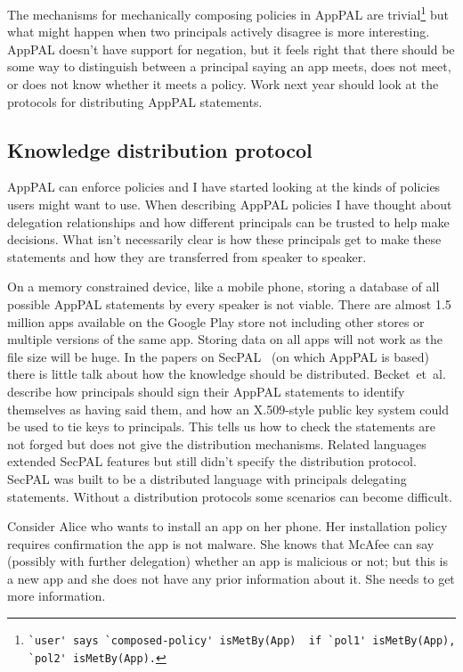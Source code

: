 \documentclass[a4paper]{scrartcl}
\begin{document}
The mechanisms for mechanically composing policies in AppPAL are trivial\footnote{\lstinline{`user' says `composed-policy' isMetBy(App)  if `pol1' isMetBy(App), `pol2' isMetBy(App).}} but what might happen when two principals actively disagree is more interesting.
AppPAL doesn't have support for negation, but it feels right that there should be some way to distinguish between a principal saying an app meets, does not meet, or does not know whether it meets a policy.
Work next year should look at the protocols for distributing AppPAL statements.

\subsection{Knowledge distribution protocol}
\label{ssec:kdp}

AppPAL can enforce policies and I have started looking at the kinds of policies users might want to use.
When describing AppPAL policies I have thought about delegation relationships and how different principals can be trusted to help make decisions.
What isn't necessarily clear is how these principals get to make these statements and how they are transferred from speaker to speaker.

On a memory constrained device, like a mobile phone, storing a database of all possible AppPAL statements by every speaker is not viable.
There are almost 1.5 million apps available on the Google Play store not including other stores or multiple versions of the same app.
Storing data on all apps will not work as the file size will be huge.
In the papers on SecPAL~\citep{Becker:2006vh,Becker:2009vt} (on which AppPAL is based) there is little talk about how the knowledge should be distributed.
Becket~et~al{.} describe how principals should sign their AppPAL statements to identify themselves as having said them, and how an X.509-style public key system could be used to tie keys to principals.
This tells us how to check the statements are not forged but does not give the distribution mechanisms.
Related languages~\citep{Becker:2009ula,Aziz:2011vt,Gurevich:2008fz,Gurevich:Qo5E3M3} extended SecPAL features but still didn't specify the distribution protocol.
SecPAL was built to be a distributed language with principals delegating statements.
Without a distribution protocols some scenarios can become difficult.

Consider Alice who wants to install an app on her phone.
Her installation policy requires confirmation the app is not malware.
She knows that McAfee can say (possibly with further delegation) whether an app is malicious or not;
  but this is a new app and she does not have any prior information about it.
She needs to get more information.
\end{document}
